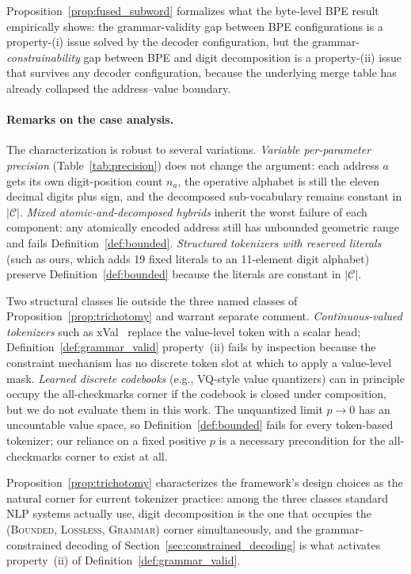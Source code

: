 \documentclass[11pt]{article}
\begin{document}
Proposition~\ref{prop:fused_subword} formalizes what the byte-level BPE result empirically shows: the grammar-validity gap between BPE configurations is a property-(i) issue solved by the decoder configuration, but the grammar-\emph{constrainability} gap between BPE and digit decomposition is a property-(ii) issue that survives any decoder configuration, because the underlying merge table has already collapsed the address--value boundary.

\paragraph{Remarks on the case analysis.}
The characterization is robust to several variations. \textit{Variable per-parameter precision} (Table~\ref{tab:precision}) does not change the argument: each address $a$ gets its own digit-position count $n_a$, the operative alphabet is still the eleven decimal digits plus sign, and the decomposed sub-vocabulary remains constant in $|\mathcal{C}|$. \textit{Mixed atomic-and-decomposed hybrids} inherit the worst failure of each component: any atomically encoded address still has unbounded geometric range and fails Definition~\ref{def:bounded}. \textit{Structured tokenizers with reserved literals} (such as ours, which adds 19 fixed literals to an 11-element digit alphabet) preserve Definition~\ref{def:bounded} because the literals are constant in $|\mathcal{C}|$.

Two structural classes lie outside the three named classes of Proposition~\ref{prop:trichotomy} and warrant separate comment. \emph{Continuous-valued tokenizers} such as xVal~\cite{xval} replace the value-level token with a scalar head; Definition~\ref{def:grammar_valid} property~(ii) fails by inspection because the constraint mechanism has no discrete token slot at which to apply a value-level mask. \emph{Learned discrete codebooks} (e.g., VQ-style value quantizers) can in principle occupy the all-checkmarks corner if the codebook is closed under composition, but we do not evaluate them in this work. The unquantized limit $p \to 0$ has an uncountable value space, so Definition~\ref{def:bounded} fails for every token-based tokenizer; our reliance on a fixed positive $p$ is a necessary precondition for the all-checkmarks corner to exist at all.

Proposition~\ref{prop:trichotomy} characterizes the framework's design choices as the natural corner for current tokenizer practice: among the three classes standard NLP systems actually use, digit decomposition is the one that occupies the (\textsc{Bounded}, \textsc{Lossless}, \textsc{Grammar}) corner simultaneously, and the grammar-constrained decoding of Section~\ref{sec:constrained_decoding} is what activates property~(ii) of Definition~\ref{def:grammar_valid}.
\end{document}
